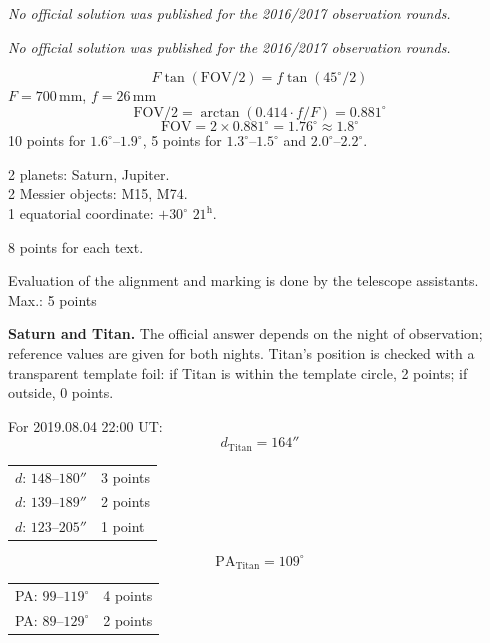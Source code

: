 \textit{No official solution was published for the 2016/2017 observation rounds.}

\textit{No official solution was published for the 2016/2017 observation rounds.}

\[ F \tan(\mathrm{FOV}/2) = f \tan(45^\circ/2) \]
$F = 700$\,mm, $f = 26$\,mm
\[ \mathrm{FOV}/2 = \arctan(0.414 \cdot f/F) = 0.881^\circ \]
\[ \mathrm{FOV} = 2 \times 0.881^\circ = 1.76^\circ \approx 1.8^\circ \]
10 points for $1.6^\circ$--$1.9^\circ$, 5 points for $1.3^\circ$--$1.5^\circ$
and $2.0^\circ$--$2.2^\circ$.

2 planets: Saturn, Jupiter.\\
2 Messier objects: M15, M74.\\
1 equatorial coordinate: $+30^\circ$ $21^{\mathrm{h}}$.

8 points for each text.

Evaluation of the alignment and marking is done by the telescope
assistants. \hfill Max.: 5 points

\textbf{Saturn and Titan.} The official answer depends on the night of
observation; reference values are given for both nights. Titan's position is
checked with a transparent template foil: if Titan is within the template
circle, 2 points; if outside, 0 points.


\medskip
For 2019.08.04 22:00 UT:
\[ d_{\mathrm{Titan}} = 164'' \]
\begin{center}
\begin{tabular}{ll}
$d$: $148$--$180''$ & 3 points \\
$d$: $139$--$189''$ & 2 points \\
$d$: $123$--$205''$ & 1 point \\
\end{tabular}
\end{center}
\[ \mathrm{PA}_{\mathrm{Titan}} = 109^\circ \]
\begin{center}
\begin{tabular}{ll}
PA: $99$--$119^\circ$ & 4 points \\
PA: $89$--$129^\circ$ & 2 points \\
\end{tabular}
\end{center}

